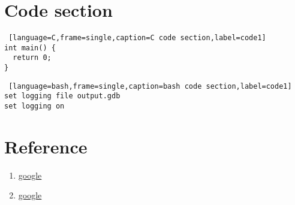 \section{Code section}
\begin{lstlisting} [language=C,frame=single,caption=C code section,label=code1]
int main() {
  return 0;
}
\end{lstlisting}

\begin{lstlisting} [language=bash,frame=single,caption=bash code section,label=code1]
set logging file output.gdb
set logging on
\end{lstlisting}


\section{Reference}

\begin{enumerate}
  \item \href{https://www.google.com/}{google}
  \item \href{https://www.google.com/}{google}
\end{enumerate}

